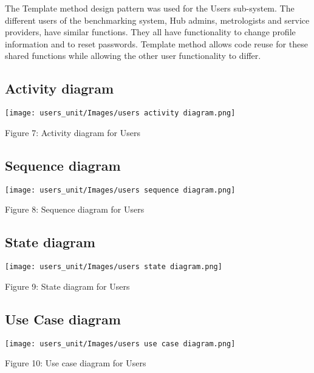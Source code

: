 	The Template method design pattern was used for the Users sub-system. The different users of the benchmarking system, Hub admins, metrologists and service providers, have similar functions. They all have functionality to change profile information and to reset passwords. Template method allows code reuse for these shared functions while allowing the other user functionality to differ.
	
		
\subsection{Activity diagram}
    \texttt{[image: users\_unit/Images/users activity diagram.png]}
	\begin{center}
	    \small{Figure 7: Activity diagram for Users}
    \end{center}


\subsection{Sequence diagram}
    \texttt{[image: users\_unit/Images/users sequence diagram.png]}
	\begin{center}
	    \small{Figure 8: Sequence diagram for Users }
    \end{center}

\subsection{State diagram}
    \texttt{[image: users\_unit/Images/users state diagram.png]}
	\begin{center}
	    \small{Figure 9: State diagram for Users}
    \end{center}




\subsection{Use Case diagram}
   \texttt{[image: users\_unit/Images/users use case diagram.png]}
    \begin{center}
    	\small{Figure 10: Use case diagram for Users}
    \end{center}